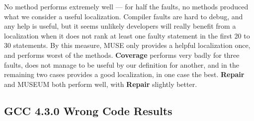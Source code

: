 No method performs extremely well --- for half the faults, no methods produced what we consider a useful localization.   Compiler faults are hard to debug, and any help is useful, but it seems unlikely developers will really benefit from a localization when it does not rank at least one faulty statement in the first 20 to 30 statements.  By this measure, MUSE only provides a helpful localization once, and performs worst of the methods.  {\bf Coverage} performs very badly for three faults, does not manage to be useful by our definition for another, and in the remaining two cases provides a good localization, in one case the best.  {\bf Repair} and MUSEUM both perform well, with {\bf Repair} slightly better.

\subsection{GCC 4.3.0 Wrong Code Results}



